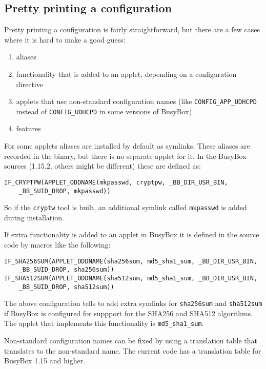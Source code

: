 \documentclass[10pt]{article}
\begin{document}
\subsection{Pretty printing a configuration}

Pretty printing a configuration is fairly straightforward, but there are a few
cases where it is hard to make a good guess:

\begin{enumerate}
\item aliases
\item functionality that is added to an applet, depending on a configuration
directive
\item applets that use non-standard configuration names (like
\texttt{CONFIG\_APP\_UDHCPD} instead of \texttt{CONFIG\_UDHCPD} in some
versions of BusyBox)
\item features
\end{enumerate}

For some applets aliases are installed by default as symlinks. These aliases
are recorded in the binary, but there is no separate applet for it. In the
BusyBox sources (1.15.2, others might be different) these are defined as:

\begin{verbatim}
IF_CRYPTPW(APPLET_ODDNAME(mkpasswd, cryptpw, _BB_DIR_USR_BIN,
    _BB_SUID_DROP, mkpasswd))
\end{verbatim}

So if the \texttt{cryptw} tool is built, an additional symlink called
\texttt{mkpasswd} is added during installation.

If extra functionality is added to an applet in BusyBox it is defined in the
source code by macros like the following:

\begin{verbatim}
IF_SHA256SUM(APPLET_ODDNAME(sha256sum, md5_sha1_sum, _BB_DIR_USR_BIN,
    _BB_SUID_DROP, sha256sum))
IF_SHA512SUM(APPLET_ODDNAME(sha512sum, md5_sha1_sum, _BB_DIR_USR_BIN,
    _BB_SUID_DROP, sha512sum))
\end{verbatim}

The above configuration tells to add extra symlinks for \texttt{sha256sum} and
\texttt{sha512sum} if BusyBox is configured for suppport for the SHA256 and
SHA512 algorithms. The applet that implements this functionality is
\texttt{md5\_sha1\_sum}.

Non-standard configuration names can be fixed by using a translation table that
translates to the non-standard name. The current code has a translation table
for BusyBox 1.15 and higher.
\end{document}
